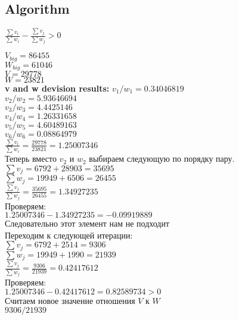 \documentclass[a4paper,12pt]{article} %
\begin{document}
\subsection{Algorithm}

$\displaystyle \frac{\displaystyle \sum v_i}{\displaystyle \sum w_i} - \frac{\displaystyle \sum v_j}{\displaystyle \sum w_j} > 0$ \\
\begin{flushleft}
$V_{big} = 86455$ \\
$W_{big} = 61046$ \\
$V = 29778$ \\
$W = 23821$ \\
\vspace{5mm}
\textbf{v and w devision results:}\newline \smallskip
$v_1 / w_1 = 0.34046819$ \\
$v_2 / w_2 = 5.93646694$ \\
$v_3 / w_3 = 4.4425146$ \\
$v_4 / w_4 = 1.26331658$ \\
$v_5 / w_5 = 4.60489163$ \\
$v_6 / w_6 = 0.08864979$ \\

$\displaystyle \frac{\sum v_i}{\sum w_i} = \frac{29778}{23821} = 1.25007346$ \\
\vspace{5mm}
Теперь вместо $v_2$ и $w_2$ выбираем следующую по порядку пару. \smallskip
$\sum v_j = 6792 + 28903 = 35695$ \\
\smallskip
$\sum w_j = 19949 + 6506 = 26455$ \\ \bigskip
$\displaystyle \frac{\sum v_j}{\sum w_j} = \frac{35695}{26455} = 1.34927235$ \\
\smallskip
Проверяем: \\
\smallskip
$1.25007346 - 1.34927235 = -0.09919889$ \quad \\
Следовательно этот элемент нам не подходит \\
\bigskip
Переходим к следующей итерации: \\
$\sum v_j = 6792 + 2514 = 9306$ \\
\smallskip
$\sum w_j = 19949 + 1990 = 21939$ \\ \bigskip
$\displaystyle \frac{\sum v_j}{\sum w_j} = \frac{9306}{21939} = 0.42417612$ \\
\smallskip
Проверяем: \\
\smallskip
$1.25007346 - 0.42417612 = 0.82589734 > 0$ \\
\bigskip
Считаем новое значение отношения $V$ к $W$ \\
\smallskip
$9306 / 21939$
\end{flushleft}
\vspace{1cm}
\end{document}
